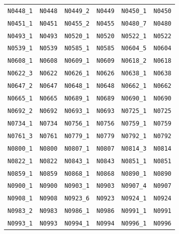 \documentclass[11pt,a4paper]{article}
\begin{document}
\begin{longtable}{@{}llllll@{}}
\texttt{N0448\_1} & \texttt{N0448} & \texttt{N0449\_2} & \texttt{N0449} & \texttt{N0450\_1} & \texttt{N0450} \\
\texttt{N0451\_1} & \texttt{N0451} & \texttt{N0455\_2} & \texttt{N0455} & \texttt{N0480\_7} & \texttt{N0480} \\
\texttt{N0493\_1} & \texttt{N0493} & \texttt{N0520\_1} & \texttt{N0520} & \texttt{N0522\_1} & \texttt{N0522} \\
\texttt{N0539\_1} & \texttt{N0539} & \texttt{N0585\_1} & \texttt{N0585} & \texttt{N0604\_5} & \texttt{N0604} \\
\texttt{N0608\_1} & \texttt{N0608} & \texttt{N0609\_1} & \texttt{N0609} & \texttt{N0618\_2} & \texttt{N0618} \\
\texttt{N0622\_3} & \texttt{N0622} & \texttt{N0626\_1} & \texttt{N0626} & \texttt{N0638\_1} & \texttt{N0638} \\
\texttt{N0647\_2} & \texttt{N0647} & \texttt{N0648\_1} & \texttt{N0648} & \texttt{N0662\_1} & \texttt{N0662} \\
\texttt{N0665\_1} & \texttt{N0665} & \texttt{N0689\_1} & \texttt{N0689} & \texttt{N0690\_1} & \texttt{N0690} \\
\texttt{N0692\_2} & \texttt{N0692} & \texttt{N0693\_1} & \texttt{N0693} & \texttt{N0725\_1} & \texttt{N0725} \\
\texttt{N0734\_1} & \texttt{N0734} & \texttt{N0756\_1} & \texttt{N0756} & \texttt{N0759\_1} & \texttt{N0759} \\
\texttt{N0761\_3} & \texttt{N0761} & \texttt{N0779\_1} & \texttt{N0779} & \texttt{N0792\_1} & \texttt{N0792} \\
\texttt{N0800\_1} & \texttt{N0800} & \texttt{N0807\_1} & \texttt{N0807} & \texttt{N0814\_3} & \texttt{N0814} \\
\texttt{N0822\_1} & \texttt{N0822} & \texttt{N0843\_1} & \texttt{N0843} & \texttt{N0851\_1} & \texttt{N0851} \\
\texttt{N0859\_1} & \texttt{N0859} & \texttt{N0868\_1} & \texttt{N0868} & \texttt{N0890\_1} & \texttt{N0890} \\
\texttt{N0900\_1} & \texttt{N0900} & \texttt{N0903\_1} & \texttt{N0903} & \texttt{N0907\_4} & \texttt{N0907} \\
\texttt{N0908\_1} & \texttt{N0908} & \texttt{N0923\_6} & \texttt{N0923} & \texttt{N0924\_1} & \texttt{N0924} \\
\texttt{N0983\_2} & \texttt{N0983} & \texttt{N0986\_1} & \texttt{N0986} & \texttt{N0991\_1} & \texttt{N0991} \\
\texttt{N0993\_1} & \texttt{N0993} & \texttt{N0994\_1} & \texttt{N0994} & \texttt{N0996\_1} & \texttt{N0996} \\

\end{longtable}
\end{document}
